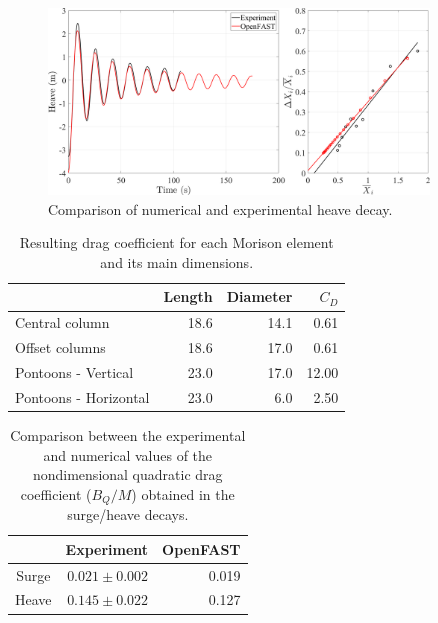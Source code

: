 \begin{figure}[!hbtp]
	\centering
	\includegraphics[width=0.9\textwidth]{./figures/heave_decay_drag_pontoon.png}	
	\caption{Comparison of numerical and experimental heave decay.} \label{fig:exp_vs_num:drag:heave_decay}
\end{figure}

\begin{table}[!hbtp]
	\caption{Resulting drag coefficient for each Morison element and its main dimensions.}\label{tab:exp_vs_num:drag:drag_coeffs}
	\begin{tabular}{lrrr}
		\toprule
		& Length & Diameter & $C_D$ \\
		\midrule
		Central column & 18.6 & 14.1 & 0.61 \\
		Offset columns & 18.6 & 17.0 & 0.61 \\
		Pontoons - Vertical & 23.0 & 17.0 & 12.00 \\
		Pontoons - Horizontal & 23.0 & 6.0 & 2.50 \\
		\bottomrule
\end{tabular}
\end{table}

\begin{table}[!hbtp]
	\caption{Comparison between the experimental and numerical values of the nondimensional quadratic drag coefficient ($B_Q/M$) obtained in the surge/heave decays.}\label{tab:exp_vs_num:drag:quad_damp_decay}
	\begin{tabular}{crr}
		\toprule
		& Experiment & OpenFAST \\
		\midrule
		Surge & $0.021\pm0.002$ & 0.019 \\
		Heave & $0.145\pm0.022$ & 0.127 \\
		\bottomrule
	\end{tabular}
\end{table}

